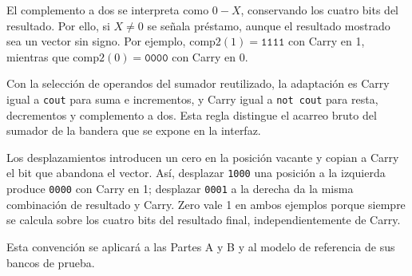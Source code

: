 El complemento a dos se interpreta como $0-X$, conservando los
cuatro bits del resultado. Por ello, si $X\ne0$ se señala préstamo,
aunque el resultado mostrado sea un vector sin signo. Por ejemplo,
$\mathrm{comp2}(1)=\texttt{1111}$ con Carry en 1, mientras que
$\mathrm{comp2}(0)=\texttt{0000}$ con Carry en 0.

Con la selección de operandos del sumador reutilizado, la adaptación
es Carry igual a \texttt{cout} para suma e incrementos, y Carry
igual a \texttt{not cout} para resta, decrementos y complemento a dos.
Esta regla distingue el acarreo bruto del sumador de la bandera
que se expone en la interfaz.

Los desplazamientos introducen un cero en la posición vacante y
copian a Carry el bit que abandona el vector. Así, desplazar
\texttt{1000} una posición a la izquierda produce \texttt{0000}
con Carry en 1; desplazar \texttt{0001} a la derecha da la misma
combinación de resultado y Carry. Zero vale 1 en ambos ejemplos
porque siempre se calcula sobre los cuatro bits del resultado final,
independientemente de Carry.

Esta convención se aplicará a las Partes A y B y al modelo de
referencia de sus bancos de prueba.
